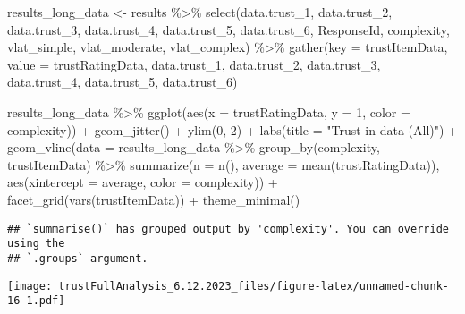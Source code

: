 \documentclass[
]{article}
\newenvironment{Shaded}{\begin{snugshade}}{\end{snugshade}}
\newcommand{\AttributeTok}[1]{\textcolor[rgb]{0.77,0.63,0.00}{#1}}
\newcommand{\DecValTok}[1]{\textcolor[rgb]{0.00,0.00,0.81}{#1}}
\newcommand{\FunctionTok}[1]{\textcolor[rgb]{0.00,0.00,0.00}{#1}}
\newcommand{\NormalTok}[1]{#1}
\newcommand{\OtherTok}[1]{\textcolor[rgb]{0.56,0.35,0.01}{#1}}
\newcommand{\SpecialCharTok}[1]{\textcolor[rgb]{0.00,0.00,0.00}{#1}}
\newcommand{\StringTok}[1]{\textcolor[rgb]{0.31,0.60,0.02}{#1}}
\begin{document}
\begin{Shaded}
\begin{Highlighting}[]
\NormalTok{results\_long\_data }\OtherTok{\textless{}{-}}\NormalTok{ results }\SpecialCharTok{\%\textgreater{}\%}
  \FunctionTok{select}\NormalTok{(data.trust\_1, data.trust\_2, data.trust\_3,}
\NormalTok{         data.trust\_4, data.trust\_5, data.trust\_6,}
\NormalTok{         ResponseId, complexity,}
\NormalTok{         vlat\_simple, vlat\_moderate, vlat\_complex) }\SpecialCharTok{\%\textgreater{}\%}
  \FunctionTok{gather}\NormalTok{(}\AttributeTok{key =}\NormalTok{ trustItemData, }\AttributeTok{value =}\NormalTok{ trustRatingData, }
\NormalTok{         data.trust\_1, data.trust\_2, data.trust\_3, data.trust\_4, data.trust\_5, data.trust\_6)}

\NormalTok{results\_long\_data }\SpecialCharTok{\%\textgreater{}\%}
  \FunctionTok{ggplot}\NormalTok{(}\FunctionTok{aes}\NormalTok{(}\AttributeTok{x =}\NormalTok{ trustRatingData, }\AttributeTok{y =} \DecValTok{1}\NormalTok{, }\AttributeTok{color =}\NormalTok{ complexity)) }\SpecialCharTok{+}
  \FunctionTok{geom\_jitter}\NormalTok{() }\SpecialCharTok{+}
  \FunctionTok{ylim}\NormalTok{(}\DecValTok{0}\NormalTok{, }\DecValTok{2}\NormalTok{) }\SpecialCharTok{+} 
  \FunctionTok{labs}\NormalTok{(}\AttributeTok{title =} \StringTok{"Trust in data (All)"}\NormalTok{) }\SpecialCharTok{+} 
  \FunctionTok{geom\_vline}\NormalTok{(}\AttributeTok{data =}\NormalTok{ results\_long\_data }\SpecialCharTok{\%\textgreater{}\%} 
               \FunctionTok{group\_by}\NormalTok{(complexity, trustItemData) }\SpecialCharTok{\%\textgreater{}\%}
               \FunctionTok{summarize}\NormalTok{(}\AttributeTok{n =} \FunctionTok{n}\NormalTok{(), }
                         \AttributeTok{average =} \FunctionTok{mean}\NormalTok{(trustRatingData)), }
             \FunctionTok{aes}\NormalTok{(}\AttributeTok{xintercept =}\NormalTok{ average, }\AttributeTok{color =}\NormalTok{ complexity)) }\SpecialCharTok{+}
  \FunctionTok{facet\_grid}\NormalTok{(}\FunctionTok{vars}\NormalTok{(trustItemData)) }\SpecialCharTok{+}
  \FunctionTok{theme\_minimal}\NormalTok{()}
\end{Highlighting}
\end{Shaded}

\begin{verbatim}
## `summarise()` has grouped output by 'complexity'. You can override using the
## `.groups` argument.
\end{verbatim}

\texttt{[image: trustFullAnalysis\_6.12.2023\_files/figure-latex/unnamed-chunk-16-1.pdf]}
\end{document}
